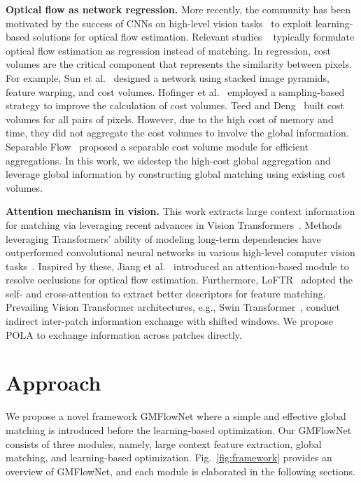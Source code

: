 \documentclass[10pt,twocolumn,letterpaper]{article}
\begin{document}
{\bf Optical flow as network regression.}
More recently, the community has been motivated by the success of CNNs on high-level vision tasks~\cite{krizhevsky2012imagenet} to exploit learning-based solutions for optical flow estimation. 
Relevant studies ~\cite{dosovitskiy2015flownet, bar2020scopeflow, hur2019iterative, sun2018pwc, Zhao2020MaskFlownetAF, teed2020raft, hofinger2020improving, zhang2021separable} typically formulate optical flow estimation as regression instead of matching. 
In regression, cost volumes are the critical component that represents the similarity between pixels. 
For example, Sun et al.~\cite{sun2018pwc} designed a network using stacked image pyramids, feature warping, and cost volumes. 
Hofinger et al.~\cite{hofinger2020improving} employed a sampling-based strategy to improve the calculation of cost volumes. 
Teed and Deng~\cite{teed2020raft} built  cost volumes for all pairs of pixels. 
However, due to the high cost of memory and time, they did not aggregate the cost volumes to involve the global information. 
Separable Flow~\cite{zhang2021separable} proposed a separable cost volume module for efficient aggregations. 
In this work, 
we sidestep the high-cost global aggregation and leverage global information by constructing global matching using existing  cost volumes. 

{\bf Attention mechanism in vision.} 
This work extracts large context information for matching via leveraging recent advances in Vision Transformers~\cite{carion2020end, dosovitskiy2021an, liu2021swin}.
Methods leveraging Transformers' ability of modeling long-term dependencies have outperformed convolutional neural networks in various high-level computer vision tasks~\cite{dosovitskiy2021an, anonymous2022patches}. 
Inspired by these, Jiang et al.~\cite{jiang2021learning} introduced an attention-based module to resolve occlusions for optical flow estimation. 
Furthermore, LoFTR~\cite{sun2021loftr} adopted the self- and cross-attention to extract better descriptors for feature matching. 
Prevailing Vision Transformer architectures, e.g., Swin Transformer~\cite{liu2021swin}, conduct indirect inter-patch information exchange with shifted windows. 
We propose POLA to exchange information across patches directly.




\section{Approach}

We propose a novel framework GMFlowNet where a simple and effective global matching is introduced before the learning-based optimization.
Our GMFlowNet consists of three modules, namely, large context feature extraction, global matching, and learning-based optimization. Fig.~\ref{fig:framework} provides an overview of GMFlowNet, and each module is elaborated in the following sections.
\end{document}

